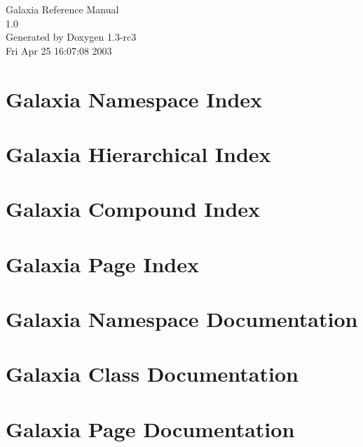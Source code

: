 \documentclass[a4paper]{book}
\begin{document}
\begin{titlepage}
\vspace*{7cm}
\begin{center}
{\Large Galaxia Reference Manual\\[1ex]\large 1.0}\\
\vspace*{1cm}
{\large Generated by Doxygen 1.3-rc3}\\
\vspace*{0.5cm}
{\small Fri Apr 25 16:07:08 2003}\\
\end{center}
\end{titlepage}
\clearemptydoublepage
{}
\tableofcontents
\clearemptydoublepage
{}
\chapter{Galaxia Namespace Index}

\chapter{Galaxia Hierarchical Index}

\chapter{Galaxia Compound Index}

\chapter{Galaxia Page Index}

\chapter{Galaxia Namespace Documentation}

\chapter{Galaxia Class Documentation}










\chapter{Galaxia Page Documentation}

\printindex
\end{document}
